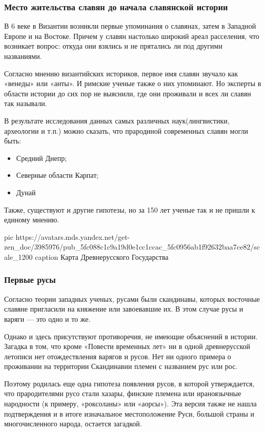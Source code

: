 \subsubsection{Место жительства славян до начала славянской истории}

В 6 веке в Византии возникли первые упоминания о славянах, затем в Западной
Европе и на Востоке. Причем у славян настолько широкий ареал расселения, что
возникает вопрос: откуда они взялись и не прятались ли под другими названиями.

Согласно мнению византийских историков, первое имя славян звучало как «венеды»
или «анты». И римские ученые также о них упоминают. Но эксперты в области
истории до сих пор не выяснили, где они проживали и всех ли славян так
называли.

В результате исследования данных самых различных наук(лингвистики, археологии и
т.п.) можно сказать, что прародиной современных славян могли быть:

\begin{itemize}
  \item Средний Днепр;
  \item Северные области Карпат;
  \item Дунай
\end{itemize}

Также, существуют и другие гипотезы, но за 150 лет ученые так и не пришли к
единому мнению.

\ifcmt
pic https://avatars.mds.yandex.net/get-zen_doc/3985976/pub_5fc088c1c9a19d0e1cc1ccac_5fc0956ab1f92632baa7ce82/scale_1200
caption Карта Древнерусского Государства
\fi

\subsubsection{Первые русы}

Согласно теории западных ученых, русами были скандинавы, которых восточные
славяне пригласили на княжение или завоевавшие их. В этом случае русы и варяги
— это одно и то же.

Однако и здесь присутствуют противоречия, не имеющие объяснений в истории.
Загадка в том, что кроме «Повести временных лет» ни в одной древнерусской
летописи нет отождествления варягов и русов. Нет ни одного примера о проживании
на территории Скандинавии племен с названием рус или рос.

Поэтому родилась еще одна гипотеза появления русов, в которой утверждается, что
прародителями русо стали хазары, финские племена или ираноязычные народности (к
примеру, «роксоланы» или «аорсы»). Эта версия также не нашла подтверждения и в
итоге изначальное местоположение Руси, большой страны и многочисленного народа,
остается загадкой.

